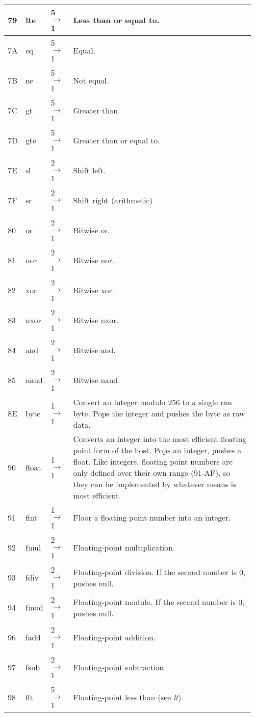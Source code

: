 \begin{longtable}{ | l | l | l | X | }
\hline
79 & lte & 5 $\rightarrow$ 1 & Less than or equal to. \\
\hline
7A & eq & 5 $\rightarrow$ 1 & Equal. \\
\hline
7B & ne & 5 $\rightarrow$ 1 & Not equal. \\
\hline
7C & gt & 5 $\rightarrow$ 1 & Greater than. \\
\hline
7D & gte & 5 $\rightarrow$ 1 & Greater than or equal to. \\
\hline
7E & sl & 2 $\rightarrow$ 1 & Shift left. \\
\hline
7F & sr & 2 $\rightarrow$ 1 & Shift right (arithmetic) \\
\hline
80 & or & 2 $\rightarrow$ 1 & Bitwise or. \\
\hline
81 & nor & 2 $\rightarrow$ 1 & Bitwise nor. \\
\hline
82 & xor & 2 $\rightarrow$ 1 & Bitwise xor. \\
\hline
83 & nxor & 2 $\rightarrow$ 1 & Bitwise nxor. \\
\hline
84 & and & 2 $\rightarrow$ 1 & Bitwise and. \\
\hline
85 & nand & 2 $\rightarrow$ 1 & Bitwise nand. \\
\hline
8E & byte & 1 $\rightarrow$ 1 & Convert an integer modulo 256 to a single raw byte. Pops the integer and pushes the byte as raw data. \\
\hline
90 & float & 1 $\rightarrow$ 1 & Converts an integer into the most efficient floating point form of the host. Pops an integer, pushes a float. Like integers, floating point numbers are only defined over their own range (91-AF), so they can be implemented by whatever means is most efficient. \\
\hline
91 & fint & 1 $\rightarrow$ 1 & Floor a floating point number into an integer. \\
\hline
92 & fmul & 2 $\rightarrow$ 1 & Floating-point multiplication. \\
\hline
93 & fdiv & 2 $\rightarrow$ 1 & Floating-point division. If the second number is 0, pushes null. \\
\hline
94 & fmod & 2 $\rightarrow$ 1 & Floating-point modulo. If the second number is 0, pushes null. \\
\hline
96 & fadd & 2 $\rightarrow$ 1 & Floating-point addition. \\
\hline
97 & fsub & 2 $\rightarrow$ 1 & Floating-point subtraction. \\
\hline
98 & flt & 5 $\rightarrow$ 1 & Floating-point less than (see \textit{lt}). \\

\end{longtable}
